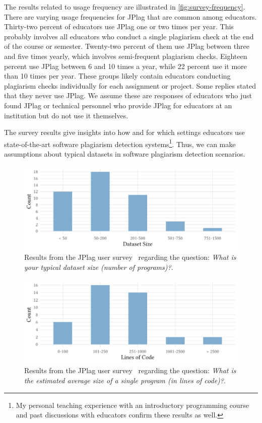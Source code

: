 The results related to usage frequency are illustrated in \autoref{fig:survey-frequency}.
There are varying usage frequencies for JPlag that are common among educators.
Thirty-two percent of educators use JPlag one or two times per year. This probably involves all educators who conduct a single plagiarism check at the end of the course or semester.
Twenty-two percent of them use JPlag between three and five times yearly, which involves semi-frequent plagiarism checks.
Eighteen percent use JPlag between 6 and 10 times a year, while 22 percent use it more than 10 times per year.
These groups likely contain educators conducting plagiarism checks individually for each assignment or project.
Some replies stated that they never use JPlag. We assume these are responses of educators who just found JPlag or technical personnel who provide JPlag for educators at an institution but do not use it themselves.

The survey results give insights into how and for which settings educators use state-of-the-art software plagiarism detection systems\footnote{My personal teaching experience with an introductory programming course and past discussions with educators confirm these results as well.}.
Thus, we can make assumptions about typical datasets in software plagiarism detection scenarios.

\begin{figure}[p]
\centering
\includegraphics[width=\linewidth]{figures/survey/survey-dataset_size.pdf}
\caption[JPlag Survey: Dataset Size]{Results from the JPlag user survey~\cite{JPlagSurvey2024} regarding the question: \textit{What is your typical dataset size (number of programs)?}.}
\label{fig:survey-dataset-size}
\end{figure}

\begin{figure}[p]
\centering
\includegraphics[width=\linewidth]{figures/survey/survey-program_size.pdf}
\caption[JPlag Survey: Program Size]{Results from the JPlag user survey~\cite{JPlagSurvey2024} regarding the question: \textit{What is the estimated average size of a single program (in lines of code)?}.}
\label{fig:survey-program-size}
\end{figure}

